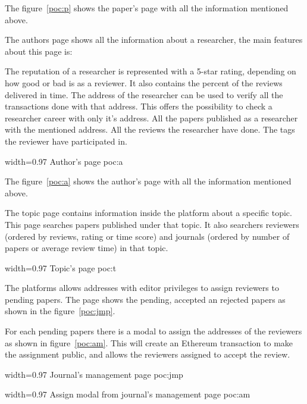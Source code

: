 The figure~\ref{poc:p} shows the paper's page with all the information mentioned
above.


The authors page shows all the information about a researcher, the main features
about this page is:

\begin{itemize}
   The reputation of a researcher is represented with a 5-star
  rating, depending on how good or bad is as a reviewer. It also contains the
  percent of the reviews delivered in time.  The
  address of the researcher can be used to verify all the transactions done with
  that address. This offers the possibility to check a researcher career with
  only it's address.  All the papers published as a
  researcher with the mentioned address.  All the reviews
  the researcher have done.  The tags the reviewer have participated
  in.
\end{itemize}

%
{width=0.97\linewidth}%
{Author's page}%
{poc:a}

The figure~\ref{poc:a} shows the author's page with all the information
mentioned above.


The topic page contains information inside the platform about a specific topic.
This page searches papers published under that topic. It also searchers
reviewers (ordered by reviews, rating or time score) and journals (ordered by
number of papers or average review time) in that topic.

%
{width=0.97\linewidth}%
{Topic's page}%
{poc:t}


The platforms allows addresses with editor privileges to assign reviewers to
pending papers. The page shows the pending, accepted an rejected papers as shown
in the figure~\ref{poc:jmp}.

For each pending papers there is a modal to assign the addresses of the
reviewers as shown in figure~\ref{poc:am}. This will create an Ethereum
transaction to make the assignment public, and allows the reviewers assigned to
accept the review.

%
{width=0.97\linewidth}%
{Journal's management page}%
{poc:jmp}

%
{width=0.97\linewidth}%
{Assign modal from journal's management page}%
{poc:am}


